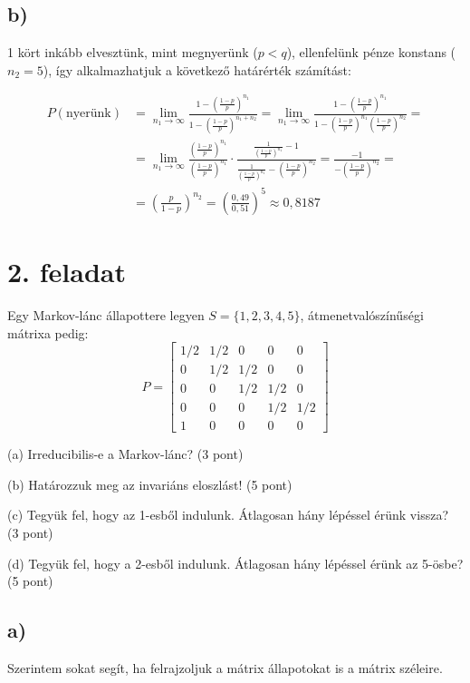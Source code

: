\documentclass[a4paper,12pt]{article}   		%
\begin{document}
\subsection*{b)}
1 kört inkább elvesztünk, mint megnyerünk ($p<q$), ellenfelünk pénze konstans
($n_2 = 5$), így alkalmazhatjuk a következő határérték számítást:

\[
\begin{split}
P(\text{nyerünk}) &= 
\lim_{n_1 \to \infty} \frac{1-\left(\frac{1-p}{p}\right)^{n_1}}
{1-\left(\frac{1-p}{p}\right)^{n_1+n_2}} =
\lim_{n_1 \to \infty} \frac{1-\left(\frac{1-p}{p}\right)^{n_1}}
{1-\left(\frac{1-p}{p}\right)^{n_1}\left(\frac{1-p}{p}\right)^{n_2}} =\\
&= \lim_{n_1 \to \infty} \frac{\left(\frac{1-p}{p}\right)^{n_1}}
{\left(\frac{1-p}{p}\right)^{n_1}} \cdot 
\frac{\frac{1}{\left(\frac{1-p}{p}\right)^{n_1}}-1}
{\frac{1}{\left(\frac{1-p}{p}\right)^{n_1}} -
\left(\frac{1-p}{p}\right)^{n_2}} 
= \frac{-1}{-\left(\frac{1-p}{p}\right)^{n_2}} =\\
&= \left(\frac{p}{1-p}\right)^{n_2} = 
\left(\frac{0,49}{0,51}\right)^{5} \approx 0,8187
\end{split}
\]

\pagebreak
\section*{2. feladat}
Egy Markov-lánc állapottere legyen $S=\{1,2,3,4,5\}$, átmenetvalószínűségi
mátrixa pedig:
\[
P = 
\begin{bmatrix}
1/2	&	1/2	&	0	&	0	&	0	\\
0	&	1/2	&	1/2	&	0	&	0	\\
0	&	0	&	1/2	&	1/2	&	0	\\
0	&	0	&	0	&	1/2	&	1/2	\\
1	&	0	&	0	&	0	&	0
\end{bmatrix}
\]

(a) Irreducibilis-e a Markov-lánc? (3 pont)

(b) Határozzuk meg az invariáns eloszlást! (5 pont)

(c) Tegyük fel, hogy az 1-esből indulunk. Átlagosan hány lépéssel érünk
vissza? (3 pont)

(d) Tegyük fel, hogy a 2-esből indulunk. Átlagosan hány lépéssel érünk
az 5-ösbe? (5 pont)

\subsection*{a)}
Szerintem sokat segít, ha felrajzoljuk a mátrix állapotokat is a mátrix
széleire.
\end{document}

